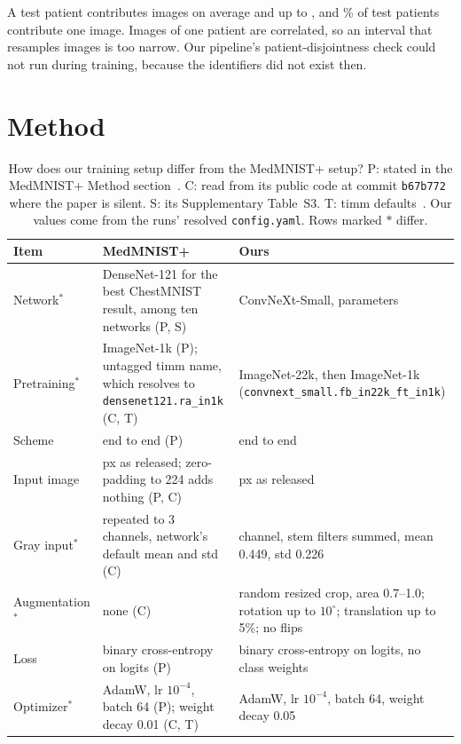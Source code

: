 \documentclass[conference]{IEEEtran}
\newif\ifanycitation
\let\citeAnyKey\cite
\renewcommand{\cite}{\global\anycitationtrue\citeAnyKey}
\begin{document}
A test patient contributes \imagesPerPatientMean{} images on average and up to
\imagesPerPatientMax{}, and \testPatientsSingle\% of test patients contribute one image.
Images of one patient are correlated, so an interval that resamples images is too narrow.
Our pipeline's patient-disjointness check could not run during training, because the
identifiers did not exist then.

\section{Method}
\label{sec:method}

\begin{table}[t]
\caption{How does our training setup differ from the MedMNIST+ setup? P: stated in the
MedMNIST+ Method section~\cite{doerrich2025medmnistplus}. C: read from its public code at
commit \textnormal{\texttt{b67b772}}~\cite{doerrich2024code} where the paper is silent. S: its
Supplementary Table~S3. T: timm defaults~\cite{wightman2024timm103}. Our values come from
the runs' resolved \textnormal{\texttt{config.yaml}}. Rows marked $\ast$ differ.}
\label{tab:setup}
\centering
\footnotesize
\renewcommand{\arraystretch}{1.08}
\begin{tabular}{@{}l>{\raggedright\arraybackslash}p{}>{\raggedright\arraybackslash}p{}@{}}
\toprule
Item & MedMNIST+ & Ours \\
\midrule
Network$^\ast$ & DenseNet-121 for the best ChestMNIST result, among ten networks (P, S) & ConvNeXt-Small, \parameters{} parameters \\
Pretraining$^\ast$ & ImageNet-1k (P); untagged timm name, which resolves to \texttt{densenet121.ra\_in1k} (C, T) & ImageNet-22k, then ImageNet-1k (\texttt{convnext\_small.fb\_in22k\_ft\_in1k}) \\
Scheme & end to end (P) & end to end \\
Input image & 224 px as released; zero-padding to 224 adds nothing (P, C) & 224 px as released \\
Gray input$^\ast$ & repeated to 3 channels, network's default mean and std (C) & 1 channel, stem filters summed, mean 0.449, std 0.226 \\
Augmentation$^\ast$ & none (C) & random resized crop, area 0.7--1.0; rotation up to $10^\circ$; translation up to 5\%; no flips \\
Loss & binary cross-entropy on logits (P) & binary cross-entropy on logits, no class weights \\
Optimizer$^\ast$ & AdamW, lr $10^{-4}$, batch 64 (P); weight decay 0.01 (C, T) & AdamW, lr $10^{-4}$, batch 64, weight decay 0.05 \\

\end{tabular}
\end{table}
\end{document}

